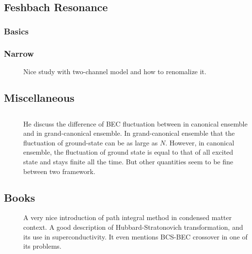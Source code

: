 \subsection{Feshbach Resonance}
\subsubsection{Basics}
\subsubsection{Narrow}
\begin{description}
  \item [\cite{JacksonNarrow}]Nice study with two-channel model and how to renomalize it. 
	
 \end{description}
 
\subsection{Miscellaneous}
\subsection{}
\begin{description}
\item[\cite{Politzer}]He discuss the difference of BEC fluctuation between in canonical ensemble and in grand-canonical ensemble.  In grand-canonical ensemble that the fluctuation of ground-state can be as large as $N$.  However, in canonical ensemble, the fluctuation of ground state is equal to that of all excited state and stays finite all the time.  But other quantities seem to be fine between two framework.  
\end{description}

\subsection{Books}
\begin{description}
\item[\cite{Altland}]A very nice introduction of path integral method in condensed matter context.  A good description of Hubbard-Stratonovich transformation, and its use in superconductivity.  It even mentions BCS-BEC crossover in one of its problems. 
\end{description}